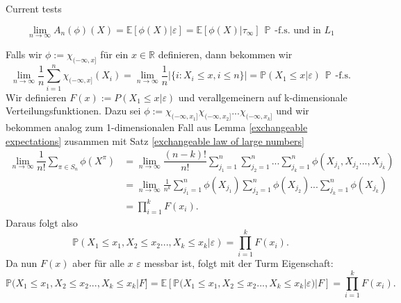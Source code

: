 \begin{section}{Current tests}
\begin{theorem}
\[
\lim_{n \to \infty}A_n(\phi)(X) = \mathbb{E}[\phi(X)|\varepsilon] = \mathbb{E}[\phi(X)|\tau_\infty]\hspace{5pt} \mathbb{P} \hspace{5pt} \text{-f.s. und in } L_1
\] 
\end{theorem}
Falls wir $\phi := \chi_{(-\infty,x]}$ für ein $x \in \mathbb{R}$ definieren, dann bekommen wir 
\[ \lim_{n \to \infty} \frac{1}{n}\sum_{i=1}^{n} \chi_{(-\infty,x]}(X_i) =  \lim_{n \to \infty} \frac{1}{n}|\{i: X_i \leq x, i \leq n\}| = \mathbb{P}(X_1 \leq x |\varepsilon) \hspace{5pt}\mathbb{P}\hspace{5pt} \text{-f.s.}
\]
Wir definieren $F(x):= P(X_1 \leq x | \varepsilon)$ und verallgemeinern auf k-dimensionale Verteilungsfunktionen. Dazu sei $\phi:= \chi_{(-\infty,x_1]}\chi_{(-\infty,x_2]}...\chi_{(-\infty,x_k]}$ und wir bekommen analog zum 1-dimensionalen Fall aus Lemma \ref{exchangeable expectations} zusammen mit Satz \ref{exchangeable law of large numbers}
\begin{align*}
\lim_{n \to \infty} \dfrac{1}{n!}\sum_{\pi \in S_n} \phi(X^\pi) &= \lim_{n \to \infty}\dfrac{(n-k)!}{n!}\sum_{j_1=1}^{n} \sum_{j_2=1}^{n}...\sum_{j_k=1}^{n} \phi(X_{j_1},X_{j_2}...,X_{j_k}) \\
&= \lim_{n \to \infty} \frac{1}{n^k} \sum_{j_1=1}^{n} \phi(X_{j_1})\sum_{j_2=1}^{n} \phi(X_{j_2})...\sum_{j_k=1}^{n} \phi(X_{j_k})\\
&= \prod_{i=1}^{k}F(x_i).
\end{align*}
Daraus folgt also
\[
\mathbb{P}(X_1 \leq x_1, X_2 \leq x_2..., X_k \leq x_k| \varepsilon) = \prod_{i=1}^k F(x_i).
\]
Da nun $F(x)$ aber für alle $x$ $\varepsilon$ messbar ist, folgt mit der Turm Eigenschaft:
\[
\mathbb{P}(X_1 \leq x_1, X_2 \leq x_2..., X_k \leq x_k|F]  
= \mathbb{E}[\mathbb{P}(X_1 \leq x_1, X_2 \leq x_2..., X_k \leq x_k| \varepsilon)|F] = \prod_{i=1}^k F(x_i).
\]

\end{section}